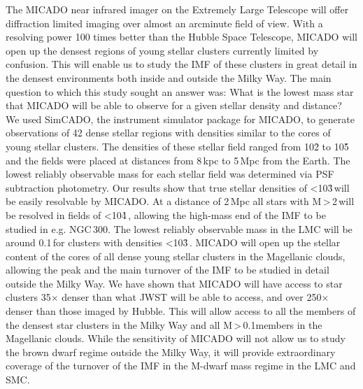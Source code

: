 \abstract
{The MICADO near infrared imager on the Extremely Large Telescope will offer diffraction limited imaging over almost an arcminute field of view. With a resolving power 100 times better than the Hubble Space Telescope, MICADO will open up the densest regions of young stellar clusters currently limited by confusion. This will enable us to study the IMF of these clusters in great detail in the densest environments both inside and outside the Milky Way.}
{The main question to which this study sought an answer was: What is the lowest mass star that MICADO will be able to observe for a given stellar density and distance?}
{We used SimCADO, the instrument simulator package for MICADO, to generate observations of 42 dense stellar regions with densities similar to the cores of young stellar clusters. The densities of these stellar field ranged from 10\h2 to 10\h5\,\spa and the fields were placed at distances from 8\,kpc to 5\,Mpc from the Earth. The lowest reliably observable mass for each stellar field was determined via PSF subtraction photometry.}
{Our results show that true stellar densities of \textless10\h3\,\spa will be easily resolvable by MICADO. At a distance of 2\,Mpc all stars with M\,\textgreater\,2\,\msun will be resolved in fields of \textless10\h4\,\spa, allowing the high-mass end of the IMF to be studied in e.g. NGC\,300. The lowest reliably observable mass in the LMC will be around 0.1\,\msun for clusters with densities \textless10\h3\,\spa. MICADO will open up the stellar content of the cores of all dense young stellar clusters in the Magellanic clouds, allowing the peak and the main turnover of the IMF to be studied in detail outside the Milky Way.}
{We have shown that MICADO will have access to star clusters 35$\times$ denser than what JWST will be able to access, and over 250$\times$ denser than those imaged by Hubble. This will allow access to all the members of the densest star clusters in the Milky Way and all M\,\textgreater\,0.1\msun members in the Magellanic clouds. While the sensitivity of MICADO will not allow us to study the brown dwarf regime outside the Milky Way, it will provide extraordinary coverage of the turnover of the IMF in the M-dwarf mass regime in the LMC and SMC.}





